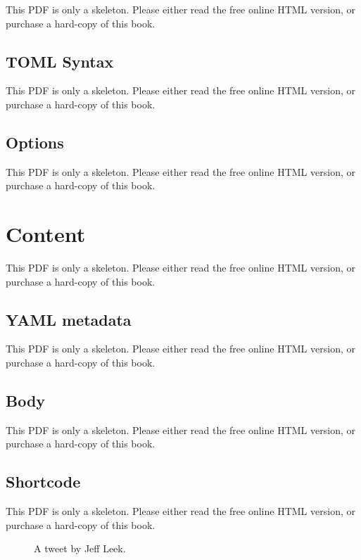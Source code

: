 \documentclass[
  12pt,
]{krantz}
\begin{document}
This PDF is only a skeleton. Please either read the free online HTML version, or purchase a hard-copy of this book.

\subsection{TOML Syntax}\label{toml-syntax}

This PDF is only a skeleton. Please either read the free online HTML version, or purchase a hard-copy of this book.

\subsection{Options}\label{options}

This PDF is only a skeleton. Please either read the free online HTML version, or purchase a hard-copy of this book.

\section{Content}\label{content}

This PDF is only a skeleton. Please either read the free online HTML version, or purchase a hard-copy of this book.

\subsection{YAML metadata}\label{yaml-metadata}

This PDF is only a skeleton. Please either read the free online HTML version, or purchase a hard-copy of this book.

\subsection{Body}\label{body}

This PDF is only a skeleton. Please either read the free online HTML version, or purchase a hard-copy of this book.

\subsection{Shortcode}\label{shortcode}

This PDF is only a skeleton. Please either read the free online HTML version, or purchase a hard-copy of this book.

\begin{figure}\caption{A tweet by Jeff Leek.}\end{figure}
\end{document}
